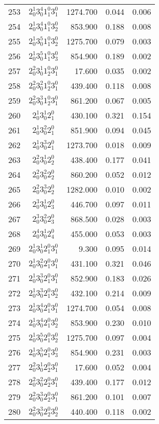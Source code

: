 \documentclass[12pt]{article}
\begin{document}
\begin{table}
\begin{tabular}{rcrrr}
253&$2_0^1 3_0^4 1_1^0 3_1^0$& 1274.700& 0.044& 0.006\\
254&$2_0^1 3_0^4 1_1^0 3_2^0$& 853.900& 0.188& 0.008\\
255&$2_0^1 3_0^5 1_1^0 3_2^0$& 1275.700& 0.079& 0.003\\
256&$2_0^1 3_0^5 1_1^0 3_3^0$& 854.900& 0.189& 0.002\\
257&$2_0^2 3_0^1 1_2^0 3_1^0$& 17.600& 0.035& 0.002\\
258&$2_0^2 3_0^2 1_2^0 3_1^0$& 439.400& 0.118& 0.008\\
259&$2_0^2 3_0^3 1_2^0 3_1^0$& 861.200& 0.067& 0.005\\
260&$2_0^1 3_0^1 2_1^0$& 430.100& 0.321& 0.154\\
261&$2_0^1 3_0^2 2_1^0$& 851.900& 0.094& 0.045\\
262&$2_0^1 3_0^3 2_1^0$& 1273.700& 0.018& 0.009\\
263&$2_0^2 3_0^1 2_2^0$& 438.400& 0.177& 0.041\\
264&$2_0^2 3_0^2 2_2^0$& 860.200& 0.052& 0.012\\
265&$2_0^2 3_0^3 2_2^0$& 1282.000& 0.010& 0.002\\
266&$2_0^3 3_0^1 2_3^0$& 446.700& 0.097& 0.011\\
267&$2_0^3 3_0^2 2_3^0$& 868.500& 0.028& 0.003\\
268&$2_0^4 3_0^1 2_4^0$& 455.000& 0.053& 0.003\\
269&$2_0^1 3_0^1 2_1^0 3_1^0$& 9.300& 0.095& 0.014\\
270&$2_0^1 3_0^2 2_1^0 3_1^0$& 431.100& 0.321& 0.046\\
271&$2_0^1 3_0^3 2_1^0 3_1^0$& 852.900& 0.183& 0.026\\
272&$2_0^1 3_0^3 2_1^0 3_2^0$& 432.100& 0.214& 0.009\\
273&$2_0^1 3_0^4 2_1^0 3_1^0$& 1274.700& 0.054& 0.008\\
274&$2_0^1 3_0^4 2_1^0 3_2^0$& 853.900& 0.230& 0.010\\
275&$2_0^1 3_0^5 2_1^0 3_2^0$& 1275.700& 0.097& 0.004\\
276&$2_0^1 3_0^5 2_1^0 3_3^0$& 854.900& 0.231& 0.003\\
277&$2_0^2 3_0^1 2_2^0 3_1^0$& 17.600& 0.052& 0.004\\
278&$2_0^2 3_0^2 2_2^0 3_1^0$& 439.400& 0.177& 0.012\\
279&$2_0^2 3_0^3 2_2^0 3_1^0$& 861.200& 0.101& 0.007\\
280&$2_0^2 3_0^3 2_2^0 3_2^0$& 440.400& 0.118& 0.002\\

\end{tabular}
\end{table}
\end{document}
